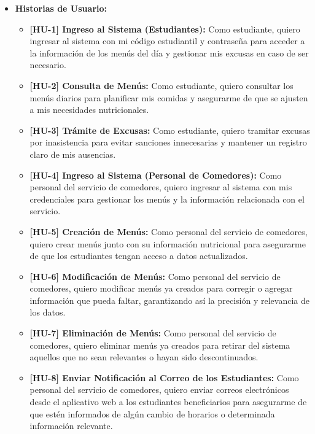 \documentclass[stu, 12pt, letterpaper, donotrepeattitle, floatsintext, natbib]{apa7}
\begin{document}
\begin{itemize}
	\item \textbf{Historias de Usuario:}
	\begin{itemize}
		\item \textbf{[HU-1] Ingreso al Sistema (Estudiantes):}
		Como estudiante, quiero ingresar al sistema con mi código estudiantil y contraseña para acceder a la información de los menús del día y gestionar mis excusas en caso de ser necesario.
		
		\item \textbf{[HU-2] Consulta de Menús:}
		Como estudiante, quiero consultar los menús diarios para planificar mis comidas y asegurarme de que se ajusten a mis necesidades nutricionales.
		
		\item \textbf{[HU-3] Trámite de Excusas:}
		Como estudiante, quiero tramitar excusas por inasistencia para evitar sanciones innecesarias y mantener un registro claro de mis ausencias.
		
		\item \textbf{[HU-4] Ingreso al Sistema (Personal de Comedores):}
		Como personal del servicio de comedores, quiero ingresar al sistema con mis credenciales para gestionar los menús y la información relacionada con el servicio.
		
		\item \textbf{[HU-5] Creación de Menús:}
		Como personal del servicio de comedores, quiero crear menús junto con su información nutricional para asegurarme de que los estudiantes tengan acceso a datos actualizados.
		
		\item \textbf{[HU-6] Modificación de Menús:}
		Como personal del servicio de comedores, quiero modificar menús ya creados para corregir o agregar información que pueda faltar, garantizando así la precisión y relevancia de los datos.
		
		\item \textbf{[HU-7] Eliminación de Menús:}
		Como personal del servicio de comedores, quiero eliminar menús ya creados para retirar del sistema aquellos que no sean relevantes o hayan sido descontinuados.
		
		\item \textbf{[HU-8] Enviar Notificación al Correo de los Estudiantes:}
		Como personal del servicio de comedores, quiero enviar correos electrónicos desde el aplicativo web a los estudiantes beneficiarios para asegurarme de que estén informados de algún cambio de horarios o determinada información relevante.
	\end{itemize}
\end{itemize}
\end{document}
